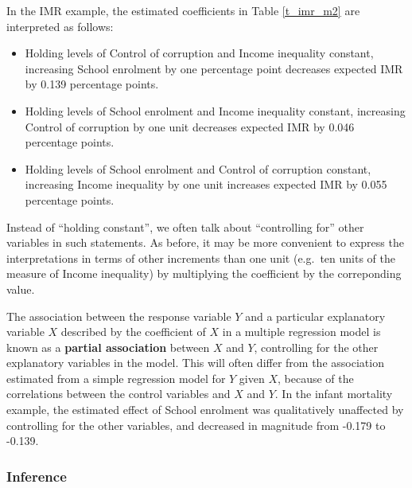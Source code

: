 In the IMR example, the estimated coefficients in Table
\ref{t_imr_m2} are interpreted as follows:
\begin{itemize}
\item
Holding levels of Control of corruption and Income inequality constant,
increasing School enrolment by one percentage point decreases expected
IMR by 0.139 percentage points.
\item
Holding levels of
School enrolment and Income inequality constant,
increasing Control of corruption by one unit
decreases expected IMR by 0.046 percentage points.
\item
Holding levels of
School enrolment and Control of corruption constant,
increasing Income inequality by one unit
increases expected IMR by 0.055 percentage points.
\end{itemize}
Instead of ``holding constant'', we often talk about ``controlling for''
other variables in such statements. As before, it may be more convenient
to express the interpretations in terms of other increments than one
unit (e.g.\ ten units of the measure of Income inequality) by
multiplying the coefficient by the correponding value.

The association between the response variable $Y$ and a particular
explanatory variable $X$ described by the coefficient of $X$ in a
multiple regression model is known as a \textbf{partial association}
between $X$ and $Y$, controlling for the other explanatory variables in
the model.
This will often differ from the association estimated from a simple regression
model for $Y$ given $X$, because of the correlations between the control
variables and $X$ and $Y$. In the infant mortality example, the
estimated effect of School enrolment was qualitatively unaffected by
controlling for the other variables, and decreased in magnitude
from -0.179 to -0.139.

\subsubsection{Inference}

